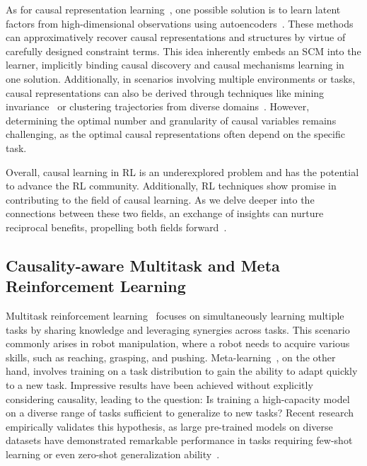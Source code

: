 \documentclass[10pt]{article} %
\theoremstyle{definition}
\begin{document}
As for causal representation learning~\citep{scholkopfCausalRepresentationLearning2021a,wangDesiderataRepresentationLearning2022,shenWeaklySupervisedDisentangled2022}, one possible solution is to learn latent factors from high-dimensional observations using autoencoders~\citep{yangCausalVAEDisentangledRepresentation2021a,eghbal-zadehLEARNINGINFERUNSEEN2021,tranUnsupervisedCausalBinary2022}. These methods can approximatively recover causal representations and structures by virtue of carefully designed constraint terms. This idea inherently embeds an SCM into the learner, implicitly binding causal discovery and causal mechanisms learning in one solution. Additionally, in scenarios involving multiple environments or tasks, causal representations can also be derived through techniques like mining invariance~\citep{zhangInvariantCausalPrediction2020a, bicaInvariantCausalImitation2021a, saengkyongamInvariantPolicyLearning2022} or clustering trajectories from diverse domains~\citep{sontakkeCausalCuriosityRL2021a}. However, determining the optimal number and granularity of causal variables remains challenging, as the optimal causal representations often depend on the specific task. 

Overall, causal learning in RL is an underexplored problem and has the potential to advance the RL community. Additionally, RL techniques show promise in contributing to the field of causal learning. As we delve deeper into the connections between these two fields, an exchange of insights can nurture reciprocal benefits, propelling both fields forward~\citep{zhuCausalDiscoveryReinforcement2022}.

\subsection{Causality-aware Multitask and Meta Reinforcement Learning}
\label{subsec:7.2multi-task}
Multitask reinforcement learning~\citep{parisottoActorMimicDeepMultitask2015, tehDistralRobustMultitask2017, deramoSharingKnowledgeMultiTask2020,vithayathilvargheseSurveyMultitaskDeep2020} focuses on simultaneously learning multiple tasks by sharing knowledge and leveraging synergies across tasks. This scenario commonly arises in robot manipulation, where a robot needs to acquire various skills, such as reaching, grasping, and pushing. Meta-learning~\citep{duanRLFastReinforcement2016, finnModelAgnosticMetaLearningFast2017, guptaMetaReinforcementLearningStructured2018, xuMetaGradientReinforcementLearning2018}, on the other hand, involves training on a task distribution to gain the ability to adapt quickly to a new task. Impressive results have been achieved without explicitly considering causality, leading to the question: Is training a high-capacity model on a diverse range of tasks sufficient to generalize to new tasks? Recent research empirically validates this hypothesis, as large pre-trained models on diverse datasets have demonstrated remarkable performance in tasks requiring few-shot learning or even zero-shot generalization ability~\citep{brownLanguageModelsAre2020, weiFinetunedLanguageModels2021}.
\end{document}
